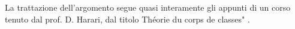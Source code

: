 
La trattazione dell'argomento segue quasi interamente gli appunti di un corso tenuto dal prof. D. Harari, dal titolo \leftquote Théorie du corps de classes" \cite{Harari}.

\vfill\break
